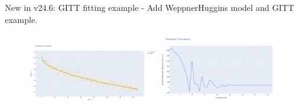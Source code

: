 \documentclass[aspectratio=169]{beamer}
\begin{document}
\begin{frame}[fragile,t]{New in v24.6: GITT fitting example}
    \vspace{-6mm}
     - Add WeppnerHuggins model and GITT example.

    \begin{figure}
        \centering
        \includegraphics[width=0.5\textwidth]{Images/Highlights/gitt_IRPropMin_fit.png}
        \includegraphics[width=0.48\textwidth]{Images/Highlights/gitt_IRPropMin_parameter.png}
        \label{fig:WeppnerHuggins}
    \end{figure}
\end{frame}
\end{document}
